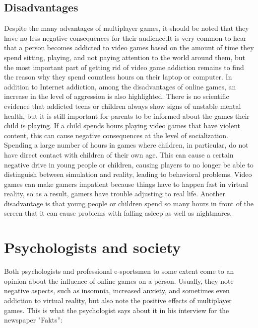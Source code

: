 \documentclass[10pt,twoside,slovak,a4paper]{article}
\begin{document}
\subsection{Disadvantages} \label{ina:este}


  Despite the many advantages of multiplayer games, it should be noted that they have no less negative consequences for their audience.It is very common to hear that a person becomes addicted to video games based on the amount of time they spend sitting, playing, and not paying attention to the world around them, but the most important part of getting rid of video game addiction remains to find the reason why they spend countless hours on their laptop or computer. In addition to Internet addiction, among the disadvantages of online games, an increase in the level of aggression is also highlighted. There is no scientific evidence that addicted teens or children always show signs of unstable mental health, but it is still important for parents to be informed about the games their child is playing. If a child spends hours playing video games that have violent content, this can cause negative consequences at the level of socialization. Spending a large number of hours in games where children, in particular, do not have direct contact with children of their own age. This can cause a certain negative drive in young people or children, causing players to no longer be able to distinguish between simulation and reality, leading to behavioral problems. Video games can make gamers impatient because things have to happen fast in virtual reality, so as a result,  gamers have trouble adjusting to real life. Another disadvantage is that young people or children spend so many hours in front of the screen that it can cause problems with falling asleep as well as nightmares.






\section{Psychologists and society } \label{}

Both psychologists and professional e-sportsmen to some extent come to an opinion about the influence of online games on a person. Usually, they note negative aspects, such as insomnia, increased anxiety, and sometimes even addiction to virtual reality, but also note the positive effects of multiplayer games. This is what the psychologist says about it in his interview for the newspaper "Fakts”:
\end{document}
